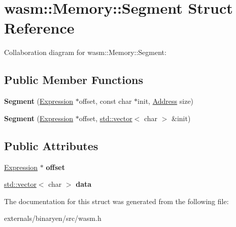 \hypertarget{structwasm_1_1_memory_1_1_segment}{}\section{wasm\+:\+:Memory\+:\+:Segment Struct Reference}
\label{structwasm_1_1_memory_1_1_segment}


Collaboration diagram for wasm\+:\+:Memory\+:\+:Segment\+:
\subsection*{Public Member Functions}
\begin{DoxyCompactItemize}
\item 
\mbox{\label{structwasm_1_1_memory_1_1_segment_ad4a9c82ac3d53bd3f37bab462f5c845a}} 
{\bfseries Segment} (\mbox{\hyperlink{classwasm_1_1_expression}{Expression}} $\ast$offset, const char $\ast$init, \mbox{\hyperlink{structwasm_1_1_address}{Address}} size)
\item 
\mbox{\label{structwasm_1_1_memory_1_1_segment_a2942011ca6fbe7d4f212463ab5b2d328}} 
{\bfseries Segment} (\mbox{\hyperlink{classwasm_1_1_expression}{Expression}} $\ast$offset, \mbox{\hyperlink{classstd_1_1vector}{std\+::vector}}$<$ char $>$ \&init)
\end{DoxyCompactItemize}
\subsection*{Public Attributes}
\begin{DoxyCompactItemize}
\item 
\mbox{\label{structwasm_1_1_memory_1_1_segment_aadfabd4787f70d7ab62a975fd125fec2}} 
\mbox{\hyperlink{classwasm_1_1_expression}{Expression}} $\ast$ {\bfseries offset}
\item 
\mbox{\label{structwasm_1_1_memory_1_1_segment_a562fd722b24e5433902a7feff57847b3}} 
\mbox{\hyperlink{classstd_1_1vector}{std\+::vector}}$<$ char $>$ {\bfseries data}
\end{DoxyCompactItemize}


The documentation for this struct was generated from the following file\+:\begin{DoxyCompactItemize}
\item 
externals/binaryen/src/wasm.\+h\end{DoxyCompactItemize}

